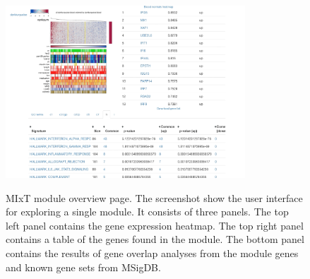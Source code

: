 \begin{figure}[h!]
\centering
\caption{MIxT module overview page. The screenshot show the user interface for
exploring a single module. It consists of three panels. The top left panel
contains the gene expression heatmap. The top right panel contains a table of
the genes found in the module. The bottom panel contains the results of gene
overlap analyses from the module genes and known gene sets from MSigDB.}
\includegraphics[width=0.8\textwidth]{figures/module.png}
\label{fig_first_case}
\end{figure} 



